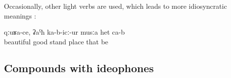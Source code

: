 Occasionally, other light verbs are used, which leads to more idiosyncratic meanings :
%
\begin{exe}
	\ex	\label{ex:This is a beautiful, pleasant place}
	\gll	qːuʁa-ce,	ʡaˁħ	ka-b-icː-ur	musːa	het	ca-b\\
		beautiful	good	stand	place	that	be\\
	\glt	{}
	

\end{exe}



\subsection{Compounds with ideophones}
\label{ssec:compoundswithideophones}

